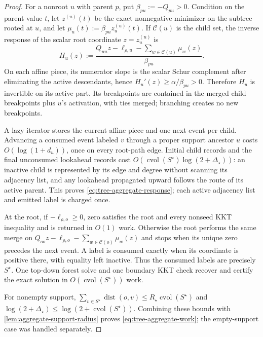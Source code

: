 \begin{proof}
For a nonroot $u$ with parent $p$, put $\beta_{pu}:=-Q_{pu}>0$.  Condition on
the parent value $t$, let $z^{(u)}(t)$ be the exact nonnegative minimizer on
the subtree rooted at $u$, and let
$\mu_u(t):=\beta_{pu}z_u^{(u)}(t)$.  If $\mathcal C(u)$ is the child set, the
inverse response of the scalar root coordinate $z=z_u^{(u)}$ is
\begin{equation}
 H_u(z):=\frac{
  Q_{uu}z-\ell_{\rho,u}-\sum_{w\in\mathcal C(u)}\mu_w(z)
 }{\beta_{pu}}.
 \label{eq:aggregate-tree-inverse}
\end{equation}
On each affine piece, its numerator slope is the scalar Schur complement
after eliminating the active descendants, hence
$H_u'(z)\geq\alpha/\beta_{pu}>0$.  Therefore $H_u$ is invertible on its active
part.  Its breakpoints are contained in the merged child breakpoints plus
$u$'s activation, with ties merged; branching creates no new breakpoints.

A lazy iterator stores the current affine piece and one next event per child.
Advancing a consumed event labeled $v$ through a proper support ancestor $u$
costs $O(\log(1+d_u))$, once on every root-path edge.  Initial child records
and the final unconsumed lookahead records cost
$O(\operatorname{cvol}(S^\star)\log(2+\Delta_\star))$: an inactive child is
represented by its edge and degree without scanning its adjacency list, and
any lookahead propagated upward follows the route of its active parent.
This proves \cref{eq:tree-aggregate-response}; each active adjacency list and
emitted label is charged once.

At the root, if $-\ell_{\rho,o}\geq0$, zero satisfies the root and every
nonseed KKT inequality and is returned in $O(1)$ work.  Otherwise the root
performs the same merge on
$Q_{oo}z-\ell_{\rho,o}-\sum_{w\in\mathcal C(o)}\mu_w(z)$ and stops when its
unique zero precedes the next event.  A label is consumed exactly when its
coordinate is positive there, with equality left inactive.  Thus the
consumed labels are precisely $S^\star$.  One top-down forest solve and one
boundary KKT check recover and certify the exact solution in
$O(\operatorname{cvol}(S^\star))$ work.

For nonempty support,
$\sum_{v\in S^\star}\operatorname{dist}(o,v)
\leq R_\star\operatorname{cvol}(S^\star)$ and
$\log(2+\Delta_\star)\leq\log(2+\operatorname{cvol}(S^\star))$.
Combining these bounds with \cref{lem:aggregate-support-radius} proves
\cref{eq:tree-aggregate-work}; the empty-support case was handled separately.
\end{proof}

